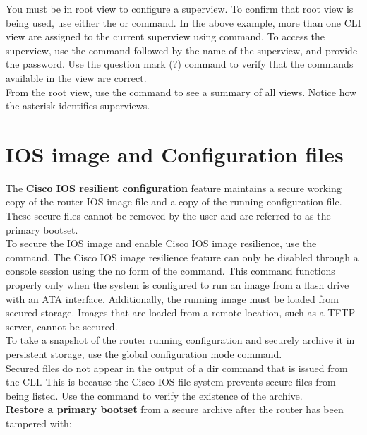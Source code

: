 You must be in root view to configure a superview. To confirm that root view is being used, use either the  or  command. In the above example, more than one CLI view are assigned to the current superview using  command. To access the superview, use the  command followed by the name of the superview, and provide the password. Use the question mark (?) command to verify that the commands available in the view are correct.\\

From the root view, use the  command to see a summary of all views. Notice how the asterisk identifies superviews.

\section{IOS image and Configuration files}

The \textbf{Cisco IOS resilient configuration} feature maintains a secure working copy of the router IOS image file and a copy of the running configuration file. These secure files cannot be removed by the user and are referred to as the primary bootset.\\

To secure the IOS image and enable Cisco IOS image resilience, use the  command.  The Cisco IOS image resilience feature can only be disabled through a console session using the no form of the command. This command functions properly only when the system is configured to run an image from a flash drive with an ATA interface. Additionally, the running image must be loaded from secured storage. Images that are loaded from a remote location, such as a TFTP server, cannot be secured.\\

To take a snapshot of the router running configuration and securely archive it in persistent storage, use the  global configuration mode command.\\

Secured files do not appear in the output of a dir command that is issued from the CLI. This is because the Cisco IOS file system prevents secure files from being listed. Use the  command to verify the existence of the archive.\\

\textbf{Restore a primary bootset} from a secure archive after the router has been tampered with:

